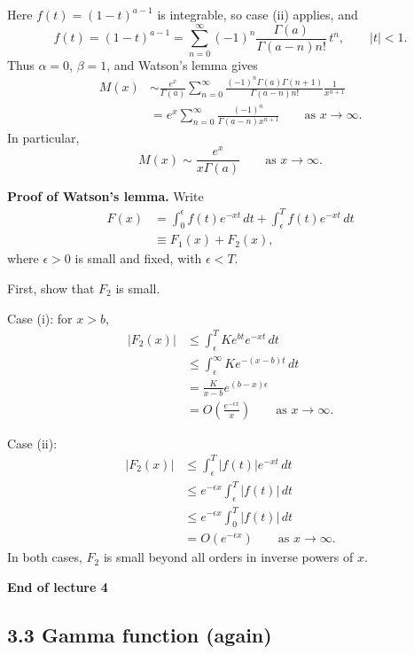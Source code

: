 \documentclass[11pt,a4paper]{article}
\begin{document}
Here $f(t)=(1-t)^{a-1}$ is integrable, so case (ii) applies, and
\[
    f(t)=(1-t)^{a-1}
    =\sum_{n=0}^\infty
    (-1)^n\frac{\Gamma(a)}{\Gamma(a-n)n!}\,t^n,
    \qquad |t|<1.
\]
Thus $\alpha=0$, $\beta=1$, and Watson's lemma gives
\begin{align*}
    M(x)
    &\sim\frac{e^x}{\Gamma(a)}
    \sum_{n=0}^\infty
    \frac{(-1)^n\Gamma(a)\Gamma(n+1)}{\Gamma(a-n)n!}
    \frac{1}{x^{n+1}}\\
    &=e^x\sum_{n=0}^\infty
    \frac{(-1)^n}{\Gamma(a-n)x^{n+1}}
    \qquad\text{as }x\to\infty.
\end{align*}
In particular,
\[
    M(x)\sim\frac{e^x}{x\Gamma(a)}
    \qquad\text{as }x\to\infty.
\]

\noindent\textbf{Proof of Watson's lemma.}
Write
\begin{align*}
    F(x)
    &=\int_0^\epsilon f(t)e^{-xt}\,dt
      +\int_\epsilon^T f(t)e^{-xt}\,dt\\
    &\equiv F_1(x)+F_2(x),
\end{align*}
where $\epsilon>0$ is small and fixed, with $\epsilon<T$.

First, show that $F_2$ is small.

\noindent Case (i): for $x>b$,
\begin{align*}
    |F_2(x)|
    &\leq\int_\epsilon^T Ke^{bt}e^{-xt}\,dt\\
    &\leq\int_\epsilon^\infty Ke^{-(x-b)t}\,dt\\
    &=\frac{K}{x-b}e^{(b-x)\epsilon}\\
    &=O\!\left(\frac{e^{-\epsilon x}}{x}\right)
    \qquad\text{as }x\to\infty.
\end{align*}

\noindent Case (ii):
\begin{align*}
    |F_2(x)|
    &\leq\int_\epsilon^T |f(t)|e^{-xt}\,dt\\
    &\leq e^{-\epsilon x}\int_\epsilon^T |f(t)|\,dt\\
    &\leq e^{-\epsilon x}\int_0^T |f(t)|\,dt\\
    &=O(e^{-\epsilon x})
    \qquad\text{as }x\to\infty.
\end{align*}
In both cases, $F_2$ is small beyond all orders in inverse powers of $x$.

\begin{center}
    \textbf{End of lecture 4}
\end{center}
\subsection*{3.3 Gamma function (again)}
\end{document}
